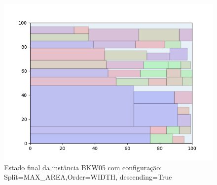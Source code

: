 \begin{figure}[H]
    \centering
    \caption[]{Estado final da instância BKW05 com configuração: Split=MAX_AREA,Order=WIDTH, descending=True}
    \label{fig:bkw05-max_area-width-true}
    \includegraphics[scale=0.5]{output/figures/bkw/bkw05/max_area/width/true/00}
\end{figure}